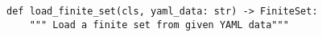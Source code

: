 \begin{verbatim}
def load_finite_set(cls, yaml_data: str) -> FiniteSet:
    """ Load a finite set from given YAML data"""
\end{verbatim}